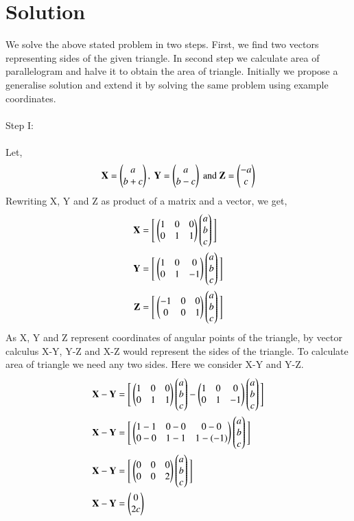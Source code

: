 \documentclass[journal,12pt]{IEEEtran}
\begin{document}
\section{Solution}
We solve the above stated problem in two steps. First, we find two vectors representing sides of the given triangle. In second step we calculate area of parallelogram and halve it to obtain the area of triangle. Initially we propose a generalise solution and extend it by solving the same problem using example coordinates.\\\\
Step I:\\\\
Let,
\begin{align}
\mathbf{X} = \begin{pmatrix}a\\b+c\end{pmatrix}, \text{ } \mathbf{Y} = \begin{pmatrix}a\\b-c\end{pmatrix} \text{ and } \mathbf{Z} = \begin{pmatrix}-a\\c\end{pmatrix}
\label{eq1}
\end{align}
Rewriting X, Y and Z as product of a matrix and a vector, we get,\\
\begin{align}
\begin{split}
\mathbf{X} & = \Bigg[\begin{pmatrix}1&0&0\\0&1&1\end{pmatrix}\begin{pmatrix}a\\b\\c\end{pmatrix}\Bigg] \\
\mathbf{Y} & = \Bigg[\begin{pmatrix}1&0&0\\0&1&-1\end{pmatrix}\begin{pmatrix}a\\b\\c\end{pmatrix}\Bigg] \\
\mathbf{Z} & = \Bigg[\begin{pmatrix}-1&0&0\\0&0&1\end{pmatrix}\begin{pmatrix}a\\b\\c\end{pmatrix}\Bigg] 
\end{split}
\label{eq2}
\end{align}
As X, Y and Z represent coordinates of angular points of the triangle, by vector calculus X-Y, Y-Z and X-Z would represent the sides of the triangle. To calculate area of triangle we need any two sides. Here we consider X-Y and Y-Z.\\
\begin{align}
\mathbf{X-Y} & = \Bigg[\begin{pmatrix}1&0&0\\0&1&1\end{pmatrix}\begin{pmatrix}a\\b\\c\end{pmatrix} - \begin{pmatrix}1&0&0\\0&1&-1\end{pmatrix}\begin{pmatrix}a\\b\\c\end{pmatrix}\Bigg] \\
\mathbf{X-Y} & = \Bigg[\begin{pmatrix}1-1&0-0&0-0\\0-0&1-1&1-(-1)\end{pmatrix}\begin{pmatrix}a\\b\\c\end{pmatrix}\Bigg] \\
\mathbf{X-Y} & = \Bigg[\begin{pmatrix}0&0&0\\0&0&2\end{pmatrix}\begin{pmatrix}a\\b\\c\end{pmatrix}\Bigg] \\
\mathbf{X-Y} & = \begin{pmatrix}0\\2c\end{pmatrix}
\label{eq3}
\end{align}
\end{document}
